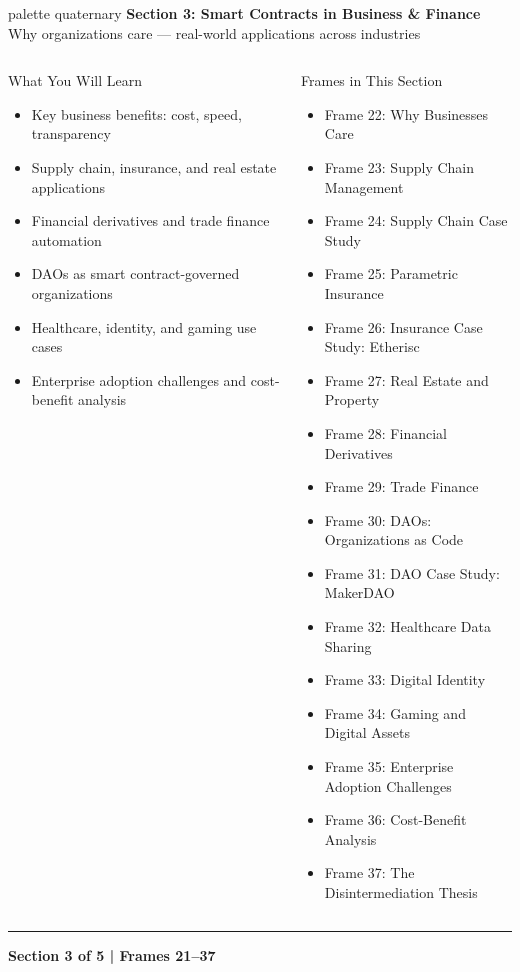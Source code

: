 \documentclass[8pt,aspectratio=169]{beamer}
\newcommand{\bottomnote}[1]{\vfill\vspace{-2mm}\textcolor{mllavender2}{\rule{\textwidth}{0.4pt}}\vspace{1mm}\footnotesize\textbf{#1}}
\begin{document}
\begin{frame}{}
\begin{beamercolorbox}[sep=12pt,center,rounded=true,shadow=true]{palette quaternary}
  {\Large\bfseries Section 3: Smart Contracts in Business \& Finance}\\[6pt]
  {\normalsize Why organizations care --- real-world applications across industries}
\end{beamercolorbox}
\vspace{4mm}
\begin{columns}[T]
\begin{block}{What You Will Learn}
\footnotesize
\begin{itemize}
  \item Key business benefits: cost, speed, transparency
  \item Supply chain, insurance, and real estate applications
  \item Financial derivatives and trade finance automation
  \item DAOs as smart contract-governed organizations
  \item Healthcare, identity, and gaming use cases
  \item Enterprise adoption challenges and cost-benefit analysis
\end{itemize}
\end{block}
\begin{block}{Frames in This Section}
\footnotesize
\begin{itemize}
  \item Frame 22: Why Businesses Care
  \item Frame 23: Supply Chain Management
  \item Frame 24: Supply Chain Case Study
  \item Frame 25: Parametric Insurance
  \item Frame 26: Insurance Case Study: Etherisc
  \item Frame 27: Real Estate and Property
  \item Frame 28: Financial Derivatives
  \item Frame 29: Trade Finance
  \item Frame 30: DAOs: Organizations as Code
  \item Frame 31: DAO Case Study: MakerDAO
  \item Frame 32: Healthcare Data Sharing
  \item Frame 33: Digital Identity
  \item Frame 34: Gaming and Digital Assets
  \item Frame 35: Enterprise Adoption Challenges
  \item Frame 36: Cost-Benefit Analysis
  \item Frame 37: The Disintermediation Thesis
\end{itemize}
\end{block}
\end{columns}
\bottomnote{Section 3 of 5 | Frames 21--37}
\end{frame}
\end{document}
